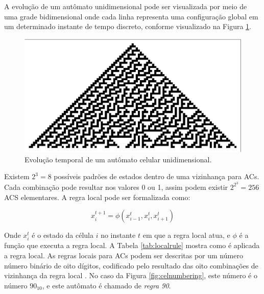 \documentclass[12pt,a4paper]{article}
\begin{document}
A evolução de um autômato unidimensional pode ser visualizada por meio de uma grade bidimensional
onde cada linha representa uma configuração global em um determinado instante de tempo discreto,
conforme visualizado na Figura \ref{fig:celautomaton}.

\begin{figure}[htp]
\begin{center}
\includegraphics[scale=0.8]{img/CellularAutomaton.eps}
\caption{Evolução temporal de um autômato celular unidimensional.}
\label{fig:celautomaton}
\end{center}
\end{figure}

Existem $2^3=8$ possíveis padrões de estados dentro de uma vizinhança para ACs.
Cada combinação pode resultar nos valores 0 ou 1, assim podem existir $2^{2^3}=256$ ACS
elementares. A regra local pode ser formalizada como:

\begin{equation}
x^{t+1}_i = \phi(x^t_{i-1}, x^t_i, x^t_{i+1})
\end{equation}

Onde $x^t_i$ é o estado da célula $i$ no instante $t$ em que a regra local atua, e $\phi$ é a função
que executa a regra local.  A Tabela \ref{tab:localrule} mostra como é aplicada a regra local.
As regras locais para ACs podem ser descritas por um número número binário de
oito dígitos, codificado pelo resultado das oito combinações de vizinhança da regra local
. No caso da Figura \ref{fig:celnumbering}, este número é o número $90_{10}$, e
este autômato é chamado de \textit{regra 90}.
\end{document}
